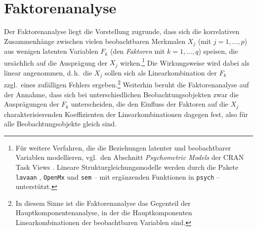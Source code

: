 \section{Faktorenanalyse}
\label{sec:multFA}

Der Faktorenanalyse liegt die Vorstellung zugrunde, dass sich die korrelativen Zusammenhänge zwischen vielen beobachtbaren Merkmalen $X_{j}$ (mit $j = 1, \ldots, p$) aus wenigen latenten Variablen $F_{k}$ (den \emph{Faktoren} mit $k = 1, \ldots, q$) speisen, die ursächlich auf die Ausprägung der $X_{j}$ wirken.\footnote{\label{ftn:structEqMod}Für weitere Verfahren, die die Beziehungen latenter und beobachtbarer Variablen modellieren, vgl.\ den Abschnitt \emph{Psychometric Models} der CRAN Task Views \cite{CRANtvPsych}. Lineare Strukturgleichungsmodelle werden durch die Pakete \lstinline!lavaan! \cite{Rosseel2012}, \lstinline!OpenMx! \cite{Boker2010} und \lstinline!sem! \cite{Fox2009b} -- mit ergänzenden Funktionen in \lstinline!psych! -- unterstützt.} Die Wirkungsweise wird dabei als linear angenommen, d.\,h.\ die $X_{j}$ sollen sich als Linearkombination der $F_{k}$ zzgl.\ eines zufälligen Fehlers ergeben.\footnote{In diesem Sinne ist die Faktorenanalyse das Gegenteil der Hauptkomponentenanalyse, in der die Hauptkomponenten Linearkombinationen der beobachtbaren Variablen sind.} Weiterhin beruht die Faktorenanalyse auf der Annahme, dass sich bei unterschiedlichen Beobachtungsobjekten zwar die Ausprägungen der $F_{k}$ unterscheiden, die den Einfluss der Faktoren auf die $X_{j}$ charakterisierenden Koeffizienten der Linearkombinationen dagegen fest, also für alle Beobachtungsobjekte gleich sind.

